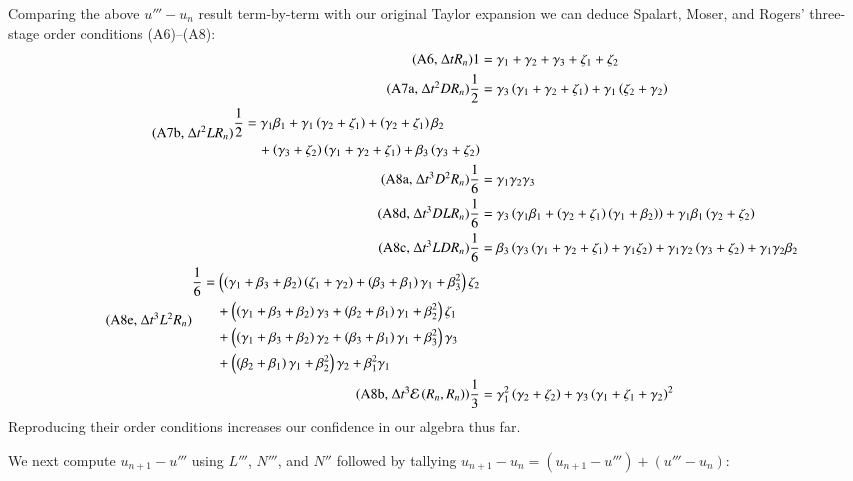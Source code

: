 \documentclass[letterpaper,11pt]{amsart}
\begin{document}
Comparing the above $u''' - u_{n}$ result term-by-term with our
original Taylor expansion we can deduce Spalart, Moser, and Rogers'
three-stage order conditions (A6)--(A8):
\begin{align*}
\tag{A6, $\Delta{}t R_{n}$}
1
&=
\gamma_{1} + \gamma_{2} + \gamma_{3} + \zeta_{1} + \zeta_{2}
\\
\tag{A7a, $\Delta{}t^{2} D R_{n}$}
\frac{1}{2}
&=
\gamma_{3} \left(
  \gamma_{1} + \gamma_{2} + \zeta_{1}
\right)
+
\gamma_{1} \left(
  \zeta_{2} + \gamma_{2}
\right)
\\
\tag{A7b, $\Delta{}t^{2} L R_{n}$}
\begin{split}
\frac{1}{2}
&=
\gamma_{1} \beta_{1}
+
\gamma_{1} \left( \gamma_{2} + \zeta_{1} \right)
+
\left( \gamma_{2} + \zeta_{1} \right) \beta_{2}
\\
&\quad{}+
\left( \gamma_{3} + \zeta_{2} \right)\left(
  \gamma_{1} + \gamma_{2} + \zeta_{1}
\right)
+
\beta_{3} \left( \gamma_{3} + \zeta_{2} \right)
\end{split}
\\
\tag{A8a, $\Delta{}t^{3} D^{2} R_{n}$}
\frac{1}{6}
&=
\gamma_{1} \gamma_{2} \gamma_{3}
\\
\tag{A8d, $\Delta{}t^{3} D L R_{n}$}
\frac{1}{6}
&=
\gamma_{3} \left(
  \gamma_{1} \beta_{1}
  +
  \left( \gamma_{2} + \zeta_{1}\right) \left( \gamma_{1} + \beta_{2} \right)
\right)
+
\gamma_{1} \beta_{1} \left(
  \gamma_{2} + \zeta_{2}
\right)
\\
\tag{A8c, $\Delta{}t^{3} L D R_{n}$}
\frac{1}{6}
&=
\beta_{3} \left(
  \gamma_{3} \left( \gamma_{1} + \gamma_{2} + \zeta_{1} \right)
  +
  \gamma_{1} \zeta_{2}
\right)
+
\gamma_{1} \gamma_{2} \left( \gamma_{3} + \zeta_{2} \right)
+
\gamma_{1} \gamma_{2} \beta_{2}
\\
\tag{A8e, $\Delta{}t^{3} L^{2} R_{n}$}
\begin{split}
\frac{1}{6}
&=
\left(
  \left( \gamma_{1} + \beta_{3} + \beta_{2} \right)
  \left( \zeta_{1} + \gamma_{2} \right)
  +
  \left( \beta_{3} + \beta_{1} \right) \gamma_{1}
  +
  \beta_{3}^{2}
\right) \zeta_{2}
\\
&\quad{}+
\left(
  \left( \gamma_{1} + \beta_{3} + \beta_{2} \right) \gamma_{3}
  +
  \left( \beta_{2} + \beta_{1} \right) \gamma_{1}
  +
  \beta_{2}^{2}
\right) \zeta_{1}
\\
&\quad{}+
\left(
  \left( \gamma_{1} + \beta_{3} + \beta_{2} \right) \gamma_{2}
  +
  \left( \beta_{3} + \beta_{1} \right) \gamma_{1}
  +
  \beta_{3}^{2}
\right) \gamma_{3}
\\
&\quad{}+
\left(
  \left( \beta_{2} + \beta_{1} \right) \gamma_{1}
  +
  \beta_{2}^{2}
\right) \gamma_{2}
+
\beta_{1}^{2} \gamma_{1}
\end{split}
\\
\tag{A8b, $\Delta{}t^{3} \mathcal{E}\left( R_{n}, R_{n} \right)$}
\frac{1}{3}
&=
\gamma_{1}^{2} \left( \gamma_{2} + \zeta_{2} \right)
+
\gamma_{3} \left( \gamma_{1} + \zeta_{1} + \gamma_{2} \right)^{2}
\end{align*}
Reproducing their order conditions increases our confidence in our algebra thus
far.

We next compute $u_{n+1}-u'''$ using $L'''$, $N'''$, and $N''$ followed by
tallying $u_{n+1}-u_{n} = (u_{n+1}-u''')+(u'''-u_{n})$:
\end{document}
